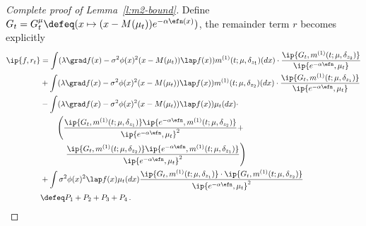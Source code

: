 \documentclass{amsart}
\begin{document}
\begin{proof}[Complete proof of Lemma~\ref{l:m2-bound}]
	Define $G_t = G^\mu_t \defeq (x \mapsto (x-M(\mu_t)) e^{-\alpha \efn(x)})$, the remainder term $r$ becomes explicitly 
	\begin{align*}
		\ip{f, r_t} & = \int (\lambda \grad f(x) - \sigma^2 \phi(x)^2 (x-M(\mu_t)) \lap f(x)) m^{(1)}(t;\mu,\delta_{z_1})(dx) \cdot \frac{\ip{G_t, m^{(1)}(t;\mu,\delta_{z_2})}}{\ip{e^{-\alpha\efn},\mu_t}} \\
		& + \int (\lambda \grad f(x) - \sigma^2 \phi(x)^2 (x-M(\mu_t)) \lap f(x)) m^{(1)}(t;\mu,\delta_{z_2})(dx) \cdot \frac{\ip{G_t, m^{(1)}(t;\mu,\delta_{z_1})}}{\ip{e^{-\alpha\efn},\mu_t}} \\
		& - \int (\lambda \grad f(x) - \sigma^2 \phi(x)^2 (x-M(\mu_t)) \lap f(x)) \mu_t(dx) \cdot \\ 
		& \qquad \left( \frac{ \ip{G_t, m^{(1)}(t;\mu,\delta_{z_1})} \ip{e^{-\alpha\efn}, m^{(1)}(t;\mu,\delta_{z_2})} }{ \ip{e^{-\alpha\efn},\mu_t}^2 } + \right. \\
		& \qquad \quad \left. \frac{ \ip{G_t, m^{(1)}(t;\mu,\delta_{z_2})} \ip{e^{-\alpha\efn}, m^{(1)}(t;\mu,\delta_{z_1})} }{ \ip{e^{-\alpha\efn},\mu_t}^2 } \right) \\
		& + \int \sigma^2 \phi(x)^2 \lap f(x) \mu_t(dx) \frac{ \ip{G_t, m^{(1)}(t;\mu,\delta_{z_1})} \cdot \ip{G_t, m^{(1)}(t;\mu,\delta_{z_2})} }{ \ip{e^{-\alpha\efn},\mu_t}^2 } \\
		& \defeq P_1 + P_2 + P_3 + P_4 \,.
	\end{align*}


\end{proof}
\end{document}
